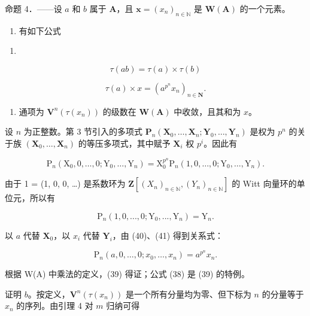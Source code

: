 命题 4．——设 \(a\) 和 \(b\) 属于 \(\mathbf{A}\)，且 \(\boldsymbol{x} = (x_n)_{n \in \mathbb{N}}\) 是 \(\mathbf{W}(\mathbf{A})\) 的一个元素。

\begin{enumerate}
\def\labelenumi{\alph{enumi})}
\tightlist
\item
  有如下公式
\end{enumerate}

\begin{enumerate}
\def\labelenumi{(\arabic{enumi})}
\setcounter{enumi}{37}
\tightlist
\item
\end{enumerate}

\[
\tau (a b) = \tau (a) \times \tau (b)\tag{39}
\]

\[
\tau (a) \times x = (a ^ {p ^ {n}} x _ {n}) _ {n \in \mathbf {N}}.
\]

\begin{enumerate}
\def\labelenumi{\alph{enumi})}
\setcounter{enumi}{1}
\tightlist
\item
  通项为 \(\mathbf{V}^{n}(\tau(x_{n}))\) 的级数在 \(\mathbf{W}(\mathbf{A})\) 中收敛，且其和为 \(x\)。
\end{enumerate}

设 \(n\) 为正整数。第 3 节引入的多项式 \(\mathbf{P}_{n}(\mathbf{X}_{0},\ldots,\mathbf{X}_{n};\mathbf{Y}_{0},\ldots,\mathbf{Y}_{n})\) 是权为 \(p^{n}\) 的关于族 \((\mathbf{X}_{0},\ldots,\mathbf{X}_{n})\) 的等压多项式，其中赋予 \(\mathbf{X}_{i}\) 权 \(p^{i}\)。因此有

\[
\mathrm{P} _ {n} \left(\mathrm{X} _ {0}, 0, \dots , 0; \mathrm{Y} _ {0}, \dots , \mathrm{Y} _ {n}\right) = \mathrm{X} _ {0} ^ {p ^ {n}} \mathrm{P} _ {n} (1, 0, \dots , 0; \mathrm{Y} _ {0}, \dots , \mathrm{Y} _ {n}).\tag{40}
\]

由于 1 = (1, 0, 0, \ldots) 是系数环为 \(\mathbf{Z}[(X_n)_{n\in\mathbb{N}}, (Y_n)_{n\in\mathbb{N}}]\) 的 Witt 向量环的单位元，所以有

\[
\mathrm{P} _ {n} (1, 0,..., 0; \mathrm{Y} _ {0},..., \mathrm{Y} _ {n}) = \mathrm{Y} _ {n}.\tag{41}
\]

以 \(a\) 代替 \(\mathbf{X}_{0}\)，以 \(x_{i}\) 代替 \(\mathbf{Y}_{i}\)，由 (40)、(41) 得到关系式：

\[
\mathrm{P} _ {n} (a, 0, \dots , 0; x _ {0}, \dots , x _ {n}) = a ^ {p ^ {n}} x _ {n}.
\]

根据 W(A) 中乘法的定义，(39) 得证；公式 (38) 是 (39) 的特例。

证明 \(b\)。按定义，\(\mathbf{V}^{n}(\tau(x_{n}))\) 是一个所有分量均为零、但下标为 \(n\) 的分量等于 \(x_{n}\) 的序列。由引理 4 对 \(m\) 归纳可得

